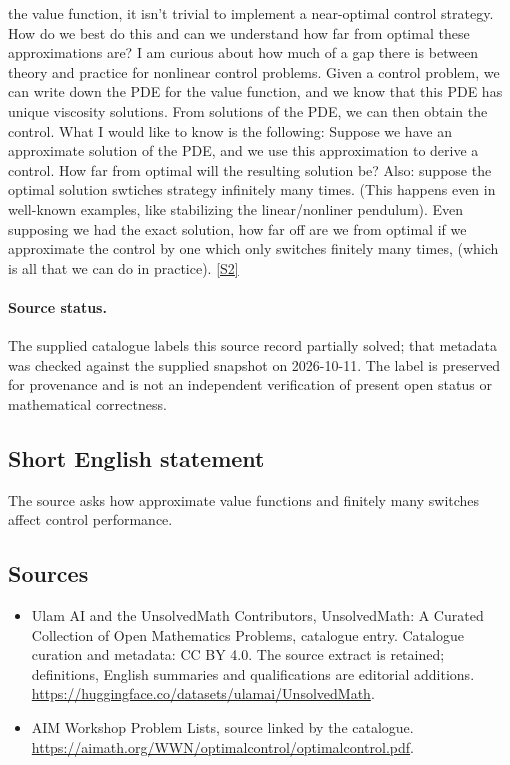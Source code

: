 \documentclass[11pt]{article}
\newcommand{\sref}[2]{\hyperlink{source:#1:#2}{[S#2]}}
\begin{document}
the value function, it isn't trivial to implement a near-optimal control strategy. How do we best do this and can we understand how far from optimal these approximations are? I am curious about how much of a gap there is between theory and practice for nonlinear control problems. Given a control problem, we can write down the PDE for the value function, and we know that this PDE has unique viscosity solutions. From solutions of the PDE, we can then obtain the control. What I would like to know is the following: Suppose we have an approximate solution of the PDE, and we use this approximation to derive a control. How far from optimal will the resulting solution be? Also: suppose the optimal solution swtiches strategy infinitely many times. (This happens even in well-known examples, like stabilizing the linear/nonliner pendulum). Even supposing we had the exact solution, how far off are we from optimal if we approximate the control by one which only switches finitely many times, (which is all that we can do in practice). \sref{statement}{2}
\paragraph{Source status.}
The supplied catalogue labels this source record partially solved; that metadata was checked against the supplied snapshot on 2026-10-11. The label is preserved for provenance and is not an independent verification of present open status or mathematical correctness.
\subsection{Short English statement}
The source asks how approximate value functions and finitely many switches affect control performance.
\subsection{Sources}
\begin{itemize}
\item[\hypertarget{source:statement:1}{S1}] Ulam AI and the UnsolvedMath Contributors, UnsolvedMath: A Curated Collection of Open Mathematics Problems, catalogue entry. Catalogue curation and metadata: CC BY 4.0. The source extract is retained; definitions, English summaries and qualifications are editorial additions.
\url{https://huggingface.co/datasets/ulamai/UnsolvedMath}.
\item[\hypertarget{source:statement:2}{S2}] AIM Workshop Problem Lists, source linked by the catalogue.
\url{https://aimath.org/WWN/optimalcontrol/optimalcontrol.pdf}.
\end{itemize}
\end{document}
